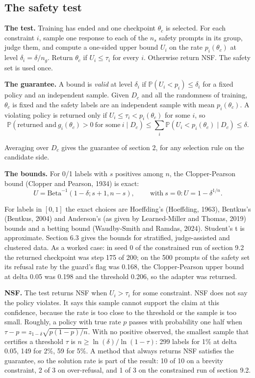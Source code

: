 \documentclass[11pt]{article}
\begin{document}
\subsection{The safety test}

\textbf{The test.} Training has ended and one checkpoint $\theta_{c}$ is selected. For each constraint $i$, sample one response to each of the $n_{s}$ safety prompts in its group, judge them, and compute a one-sided upper bound $U_{i}$ on the rate $p_{i} (\theta_{c} )$ at level $\delta_{i} = \delta / n_{g}$. Return $\theta_{c}$ if $U_{i} \le \tau_{i}$ for every $i$. Otherwise return NSF. The safety set is used once.


\textbf{The guarantee.} A bound is \emph{valid} at level $\delta_{i}$ if $\mathbb{P} ( U_{i} < p_{i} ) \le \delta_{i}$ for a fixed policy and an independent sample. Given $D_{c}$ and all the randomness of training, $\theta_{c}$ is fixed and the safety labels are an independent sample with mean $p_{i} (\theta_{c} )$. A violating policy is returned only if $U_{i} \le \tau_{i} < p_{i} (\theta_{c} )$ for some $i$, so
\[
\mathbb{P} ( \text{returned and}\ g_{i} (\theta_{c} ) > 0\ \text{for some}\ i \mid D_{c} ) \le \sum_{i} \mathbb{P} ( U_{i} < p_{i} (\theta_{c} ) \mid D_{c} ) \le \delta .
\]

Averaging over $D_{c}$ gives the guarantee of section 2, for any selection rule on the candidate side.


\textbf{The bounds.} For 0/1 labels with $s$ positives among $n$, the Clopper-Pearson bound (Clopper and Pearson, 1934) is exact:
\[
U = \mathrm{Beta} ^{-1}( 1 - \delta ; s + 1, n - s ),\qquad\ \text{with}\ s = 0: U = 1 - \delta ^{1/n}.
\]

For labels in $[0, 1]$ the exact choices are Hoeffding's (Hoeffding, 1963), Bentkus's (Bentkus, 2004) and Anderson's (as given by Learned-Miller and Thomas, 2019) bounds and a betting bound (Waudby-Smith and Ramdas, 2024). Student's t is approximate. Section 6.3 gives the bounds for stratified, judge-assisted and clustered data. As a worked case: in seed 0 of the constrained run of section 9.2 the returned checkpoint was step 175 of 200; on the 500 prompts of the safety set its refusal rate by the guard's flag was 0.168, the Clopper-Pearson upper bound at delta 0.05 was 0.198 and the threshold 0.206, so the adapter was returned.


\textbf{NSF.} The test returns NSF when $U_{i} > \tau_{i}$ for some constraint. NSF does not say the policy violates. It says this sample cannot support the claim at this confidence, because the rate is too close to the threshold or the sample is too small. Roughly, a policy with true rate $p$ passes with probability one half when $\tau - p = z_{1-\delta } \sqrt{p (1 - p ) / n}$. With no positive observed, the smallest sample that certifies a threshold $\tau$ is $n \ge \ln (\delta ) / \ln (1 - \tau )$: 299 labels for 1\% at delta 0.05, 149 for 2\%, 59 for 5\%. A method that always returns NSF satisfies the guarantee, so the solution rate is part of the result: 10 of 10 on a brevity constraint, 2 of 3 on over-refusal, and 1 of 3 on the constrained run of section 9.2.
\end{document}
